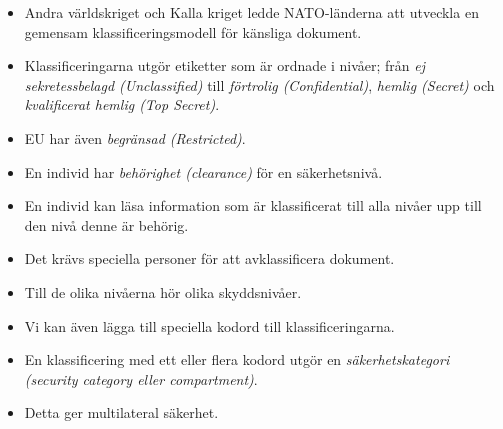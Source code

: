 \begin{frame}{\insertsubsectionhead}
  \begin{itemize}
    \item Andra världskriget och Kalla kriget ledde NATO-länderna att utveckla 
      en gemensam klassificeringsmodell för känsliga dokument.
    \item Klassificeringarna utgör etiketter som är ordnade i nivåer; från 
      \emph{ej sekretessbelagd (Unclassified)} till \emph{förtrolig 
      (Confidential)}, \emph{hemlig (Secret)} och \emph{kvalificerat hemlig 
      (Top Secret)}.
    \item EU har även \emph{begränsad (Restricted)}.
    \item En individ har \emph{behörighet (clearance)} för en säkerhetsnivå.
  \end{itemize}
\end{frame}
\begin{frame}{\insertsubsectionhead}
  \begin{itemize}
    \item En individ kan läsa information som är klassificerat till alla nivåer 
      upp till den nivå denne är behörig.
    \item Det krävs speciella personer för att avklassificera dokument.
    \item Till de olika nivåerna hör olika skyddsnivåer.
  \end{itemize}
\end{frame}
\begin{frame}{\insertsubsectionhead}
  \begin{itemize}
    \item Vi kan även lägga till speciella kodord till klassificeringarna.
    \item En klassificering med ett eller flera kodord utgör en 
      \emph{säkerhetskategori (security category eller compartment)}.
    \item Detta ger multilateral säkerhet.
  \end{itemize}
\end{frame}
